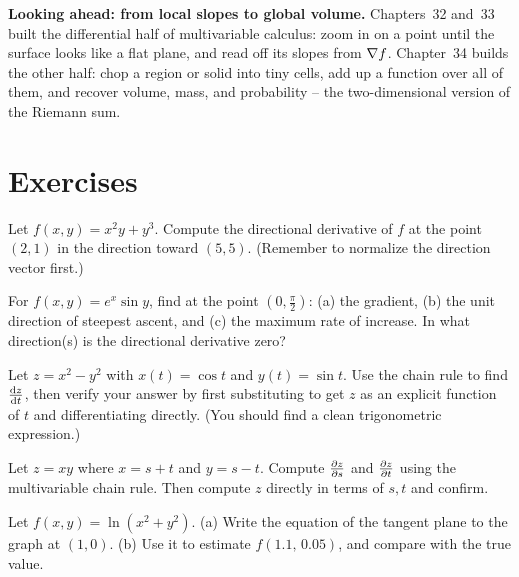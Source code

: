 \begin{connectionbox}
\textbf{Looking ahead: from local slopes to global volume.}
Chapters~32 and~33 built the differential half of multivariable calculus: zoom in on a point until the surface looks like a flat plane, and read off its slopes from $\nabla f$.
Chapter~34 builds the other half: chop a region or solid into tiny cells, add up a function over all of them, and recover volume, mass, and probability -- the two-dimensional version of the Riemann sum.
\end{connectionbox}

\section{Exercises}
\label{ch33:exercises}

\begin{exercise}
\label{ch33:exr-dir}
Let $f(x,y) = x^2 y + y^3$. Compute the directional derivative of $f$ at the point
$(2,1)$ in the direction toward $(5,5)$. (Remember to normalize the direction
vector first.)
\end{exercise}

\begin{exercise}
\label{ch33:exr-steep}
For $f(x,y) = e^{x}\sin y$, find at the point $(0,\tfrac{\pi}{2})$: (a) the
gradient, (b) the unit direction of steepest ascent, and (c) the maximum rate of
increase. In what direction(s) is the directional derivative zero?
\end{exercise}

\begin{exercise}
\label{ch33:exr-chain1}
Let $z = x^2 - y^2$ with $x(t) = \cos t$ and $y(t) = \sin t$. Use the chain rule to
find $\frac{\mathrm{d} z}{\mathrm{d} t}$, then verify your answer by first substituting to get $z$ as an
explicit function of $t$ and differentiating directly. (You should find a clean
trigonometric expression.)
\end{exercise}

\begin{exercise}
\label{ch33:exr-chain2}
Let $z = x y$ where $x = s + t$ and $y = s - t$. Compute $\frac{\partial z}{\partial s}$ and
$\frac{\partial z}{\partial t}$ using the multivariable chain rule. Then compute $z$ directly in terms
of $s,t$ and confirm.
\end{exercise}

\begin{exercise}
\label{ch33:exr-plane}
Let $f(x,y) = \ln(x^2 + y^2)$. (a) Write the equation of the tangent plane to the
graph at $(1,0)$. (b) Use it to estimate $f(1.1,\,0.05)$, and compare with the true
value.
\end{exercise}

